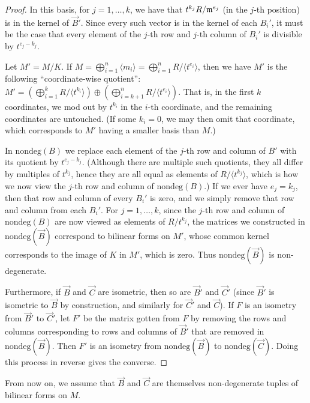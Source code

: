 \begin{enumerate}
\begin{proof}
In this basis, for $j=1,\dotsc,k$, we have that $t^{k_j} R / \mathfrak{m}^{e_j}$ (in the $j$-th position) is in the kernel of $\vec{B}'$. Since every such vector is in the kernel of each $B_i'$, it must be the case that every element of the $j$-th row and $j$-th column of $B_i'$ is divisible by $t^{e_j - k_j}$. 


Let $M' = M / K$. If $M = \bigoplus_{i=1}^n \langle m_i \rangle = \bigoplus_{i=1}^n R/\langle t^{e_i} \rangle$, then we have $M'$ is the following ``coordinate-wise quotient'': $M' = \left(\bigoplus_{i=1}^k R/\langle t^{k_i}  \rangle\right) \oplus \left(\bigoplus_{i=k+1}^n R/\langle t^{e_i} \rangle \right)$. That is, in the first $k$ coordinates, we mod out by $t^{k_i}$ in the $i$-th coordinate, and the remaining coordinates are untouched. (If some $k_i=0$, we may then omit that coordinate, which corresponds to $M'$ having a smaller basis than $M$.)

In $\text{nondeg}(B)$ we replace each element of the $j$-th row and column of $B'$ with its quotient by $t^{e_j - k_j}$. (Although there are multiple such quotients, they all differ by multiples of $t^{k_j}$, hence they are all equal as elements of $R/\langle t^{k_j} \rangle$, which is how we now view the $j$-th row and column of $\text{nondeg}(B)$.) If we ever have $e_j = k_j$, then that row and column of every $B_i'$ is zero, and we simply remove that row and column from each $B_i'$. For $j=1,\dotsc,k$, since the $j$-th row and column of $\text{nondeg}(B)$ are now viewed as elements of $R/t^{k_j}$, the matrices we constructed in $\text{nondeg}(\vec{B})$ correspond to bilinear forms on $M'$, whose common kernel corresponds to the image of $K$ in $M'$, which is zero. Thus $\text{nondeg}(\vec{B})$ is non-degenerate.

Furthermore, if $\vec{B}$ and $\vec{C}$ are isometric, then so are $\vec{B}'$ and $\vec{C}'$ (since $\vec{B}'$ is isometric to $\vec{B}$ by construction, and similarly for $\vec{C}'$ and $\vec{C}$). If $F$ is an isometry from $\vec{B}'$ to $\vec{C}'$, let $F'$ be the matrix gotten from $F$ by removing the rows and columns corresponding to rows and columns of $\vec{B}'$ that are removed in $\text{nondeg}(\vec{B})$. Then $F'$ is an isometry from $\text{nondeg}(\vec{B})$ to $\text{nondeg}(\vec{C})$. Doing this process in reverse gives the converse.
\end{proof}

From now on, we assume that $\vec{B}$ and $\vec{C}$ are themselves non-degenerate tuples of bilinear forms on $M$.


\end{enumerate}
